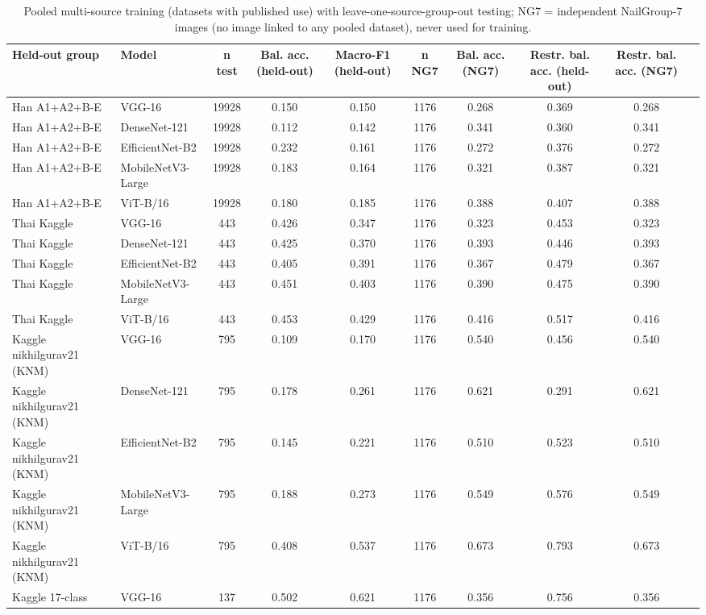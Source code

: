 \begin{table}[!tbp]
\centering
\caption{Pooled multi-source training (datasets with published use) with leave-one-source-group-out testing; NG7 = independent NailGroup-7 images (no image linked to any pooled dataset), never used for training.}
\label{tab:multisource}
\footnotesize
\begin{tabular}{llcccccccc}
\hline
Held-out group & Model & n test & Bal. acc. (held-out) & Macro-F1 (held-out) & n NG7 & Bal. acc. (NG7) & Restr. bal. acc. (held-out) & Restr. bal. acc. (NG7) \\
\hline
Han A1+A2+B-E & VGG-16 & 19928 & 0.150 & 0.150 & 1176 & 0.268 & 0.369 & 0.268 \\
Han A1+A2+B-E & DenseNet-121 & 19928 & 0.112 & 0.142 & 1176 & 0.341 & 0.360 & 0.341 \\
Han A1+A2+B-E & EfficientNet-B2 & 19928 & 0.232 & 0.161 & 1176 & 0.272 & 0.376 & 0.272 \\
Han A1+A2+B-E & MobileNetV3-Large & 19928 & 0.183 & 0.164 & 1176 & 0.321 & 0.387 & 0.321 \\
Han A1+A2+B-E & ViT-B/16 & 19928 & 0.180 & 0.185 & 1176 & 0.388 & 0.407 & 0.388 \\
Thai Kaggle & VGG-16 & 443 & 0.426 & 0.347 & 1176 & 0.323 & 0.453 & 0.323 \\
Thai Kaggle & DenseNet-121 & 443 & 0.425 & 0.370 & 1176 & 0.393 & 0.446 & 0.393 \\
Thai Kaggle & EfficientNet-B2 & 443 & 0.405 & 0.391 & 1176 & 0.367 & 0.479 & 0.367 \\
Thai Kaggle & MobileNetV3-Large & 443 & 0.451 & 0.403 & 1176 & 0.390 & 0.475 & 0.390 \\
Thai Kaggle & ViT-B/16 & 443 & 0.453 & 0.429 & 1176 & 0.416 & 0.517 & 0.416 \\
Kaggle nikhilgurav21 (KNM) & VGG-16 & 795 & 0.109 & 0.170 & 1176 & 0.540 & 0.456 & 0.540 \\
Kaggle nikhilgurav21 (KNM) & DenseNet-121 & 795 & 0.178 & 0.261 & 1176 & 0.621 & 0.291 & 0.621 \\
Kaggle nikhilgurav21 (KNM) & EfficientNet-B2 & 795 & 0.145 & 0.221 & 1176 & 0.510 & 0.523 & 0.510 \\
Kaggle nikhilgurav21 (KNM) & MobileNetV3-Large & 795 & 0.188 & 0.273 & 1176 & 0.549 & 0.576 & 0.549 \\
Kaggle nikhilgurav21 (KNM) & ViT-B/16 & 795 & 0.408 & 0.537 & 1176 & 0.673 & 0.793 & 0.673 \\
Kaggle 17-class & VGG-16 & 137 & 0.502 & 0.621 & 1176 & 0.356 & 0.756 & 0.356 \\

\end{tabular}
\end{table}
